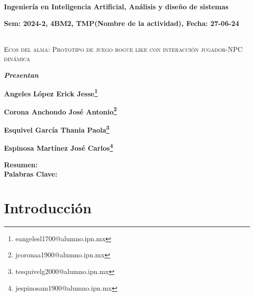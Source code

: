 \documentclass[12pt,twoside]{article}
\begin{document}
	
	\centerline{\bf Ingeniería en Inteligencia Artificial, Análisis y diseño de sistemas}
	
	\centerline{\bf Sem: 2024-2, 4BM2, TMP(Nombre de la actividad), Fecha: 27-06-24\\\\}
	
	\centerline{}
	
	
	
	\begin{center}
		\Large{\textsc{Ecos del alma: Prototipo de juego rogue like con interacción jugador-NPC dinámica}} 
	\end{center}
	\centerline{}
	\centerline{\bf {\textit{Presentan}}}
	\centerline{}
	\centerline{\bf {Angeles López Erick Jesse\footnote{eangelesl1700@alumno.ipn.mx}}}
	\centerline{\bf {Corona Anchondo José Antonio\footnote{jcoronaa1900@alumno.ipn.mx}}}
	\centerline{\bf {Esquivel García Thania Paola\footnote{tesquivelg2000@alumno.ipn.mx}}}
	\centerline{\bf {	Espinosa Martínez José Carlos\footnote{jespinosam1900@alumno.ipn.mx}}}
	
	
	
	\newtheorem{Theorem}{\quad Theorem}[section]
	
	\newtheorem{Definition}[Theorem]{\quad Definition}
	
	\newtheorem{Corollary}[Theorem]{\quad Corollary}
	
	\newtheorem{Lemma}[Theorem]{\quad Lemma}
	
	\newtheorem{Example}[Theorem]{\quad Example}
	
	\bigskip
	
	\bigskip
	
	\textbf{Resumen:}  \\ 
	
	{\bf Palabras Clave:} \\
	
	\clearpage
	
	\tableofcontents
		
	\clearpage
		
	\section{Introducción}
	
	\clearpage
\end{document}
